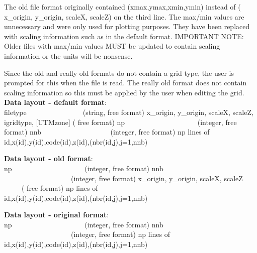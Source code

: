 \documentclass{article}
\begin{document}
The old file format originally contained (xmax,ymax,xmin,ymin) instead of ( x\_origin, y\_origin, scaleX, scaleZ) on the
third line. The max/min values are unnecessary and were only used for plotting purposes. They have been replaced
with scaling information such as in the default format. IMPORTANT NOTE: Older files with max/min values MUST
be updated to contain scaling information or the units will be nonsense.  

Since the old and really old formats do not contain a grid type, the user is prompted for this when the file is read.
The really old format does not contain scaling information so this must be applied by the user when editing the grid.\\

\textbf{Data layout - default format}: \\ 

\noindent
filetype\ \ \ \ \ \ \ \ \ \ \ \ \ \ \ \ (string, free format) \newline
x\_origin, y\_origin, scaleX, scaleZ, igridtype,  [UTMzone] ( free format)\newline
np \ \ \ \ \ \ \ \ \ \ \ \ \ \ \ \ \ \ \ \ (integer, free format)\newline
nnb \ \ \ \ \ \ \ \ \ \ \ \ \ \ \ \ \ \ \ (integer, free format)\newline
np lines of \\
id,x(id),y(id),code(id),z(id),(nbr(id,j),j=1,nnb)\newline

\textbf{Data layout - old format}: \\ 

\noindent
np \ \ \ \ \ \ \ \ \ \ \ \ \ \ \ \ \ \ \ \ (integer, free format)\newline
nnb \ \ \ \ \ \ \ \ \ \ \ \ \ \ \ \ \ \ \ (integer, free format)\newline
x\_origin, y\_origin, scaleX, scaleZ \ \ \ \ \ ( free format)\newline
np lines of \\
id,x(id),y(id),code(id),z(id),(nbr(id,j),j=1,nnb)\newline

\textbf{Data layout - original format}: \\ 

\noindent
np \ \ \ \ \ \ \ \ \ \ \ \ \ \ \ \ \ \ \ \ (integer, free format)\newline
nnb \ \ \ \ \ \ \ \ \ \ \ \ \ \ \ \ \ \ \ (integer, free format)\newline
np lines of \\
id,x(id),y(id),code(id),z(id),(nbr(id,j),j=1,nnb)\newline
\end{document}
